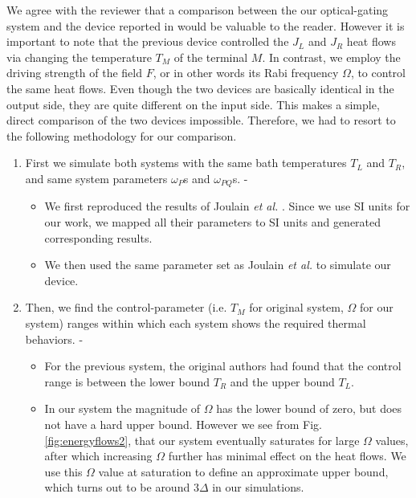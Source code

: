 \documentclass{article}
\begin{document}
We agree with the reviewer that a comparison between the our optical-gating system and the device reported in \cite{joulain2016quantum} would be valuable to the reader. However it is important to note that the previous device controlled the $J_L$ and $J_R$ heat flows via changing the temperature $T_M$ of the terminal $M$. In contrast, we employ the driving strength of the field $F$, or in other words its Rabi frequency $\Omega$, to control the same heat flows. Even though the two devices are basically identical in the output side, they are quite different on the input side. This makes a simple, direct comparison of the two devices impossible. Therefore, we had to resort to the following methodology for our comparison.
\begin{enumerate}
    \item First we simulate both systems with the same bath temperatures $T_L$ and $T_R$, and same system parameters $\omega_P$s and $\omega_{PQ}$s. -
    \begin{itemize}
        \item We first reproduced the results of Joulain \textit{et al.} \cite{joulain2016quantum}. Since we use SI units for our work, we mapped all their parameters to SI units and generated corresponding results.
        \item We then used the same parameter set as Joulain \textit{et al.} \cite{joulain2016quantum} to simulate our device.
    \end{itemize}

    \item Then, we find the control-parameter (i.e. $T_M$ for original system, $\Omega$ for our system) ranges within which each system shows the required thermal behaviors. -
    \begin{itemize}
        \item For the previous system, the original authors had found that the control range is between the lower bound $T_R$ and the upper bound $T_L$.
        \item In our system the magnitude of $\Omega$ has the lower bound of zero, but does not have a hard upper bound. However we see from Fig. \ref{fig:energyflows2}, that our system eventually saturates for large $\Omega$ values, after which increasing $\Omega$ further has minimal effect on the heat flows. We use this $\Omega$ value at saturation to define an approximate upper bound, which turns out to be around $3\Delta$ in our simulations.
    \end{itemize}


\end{enumerate}
\end{document}
